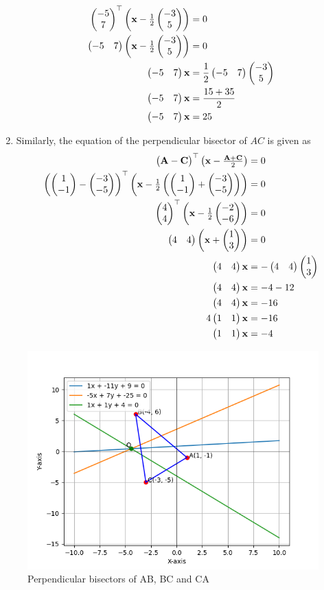 \documentclass[]{article}
\begin{document}
\begin{enumerate}
{\begin{align}
{\myvec{-5\\7}}^\top \myvec{\vec{x} - \frac{1}{2}\myvec{-3\\5}} &= 0\\
\myvec{-5&7} \myvec{\vec{x} - \frac{1}{2}\myvec{-3\\5}} &= 0\\
\myvec{-5&7}\vec{x} &= \frac{1}{2}\myvec{-5&7}\myvec{-3\\5}\\
\myvec{-5&7}\vec{x} &= \frac{15+35}{2}\\
\myvec{-5&7}\vec{x} &= 25
\end{align}}
\item {Similarly, the equation of the perpendicular bisector of $AC$ is given as
\begin{align}
{\myvec{\vec{A}-\vec{C}}}^\top \myvec{\vec{x} - \frac{\vec{A}+\vec{C}}{2}} &= 0 \\
{\myvec{\myvec{1\\-1}-\myvec{-3\\-5}}}^\top \myvec{\vec{x} - \frac{1}{2} \myvec{\myvec{1\\-1}+\myvec{-3\\-5}}  } &= 0 \\
{\myvec{4\\4}}^\top \myvec{\vec{x} - \frac{1}{2}\myvec{-2\\-6}} &= 0\\
\myvec{4&4}\myvec{\vec{x}+\myvec{1\\3}} &= 0\\
\myvec{4&4}\vec{x} &= -\myvec{4&4}\myvec{1\\3}\\
\myvec{4&4}\vec{x} &= -4-12 \\
\myvec{4&4}\vec{x} &= -16 \\
4\myvec{1&1}\vec{x} &= -16 \\
\myvec{1&1}\vec{x} &= -4
\end{align}}
\end{enumerate}
\begin{figure}
\includegraphics{figs/perp_bisector.png}
\caption{Perpendicular bisectors of AB, BC and CA}
\end{figure}
\end{document}
